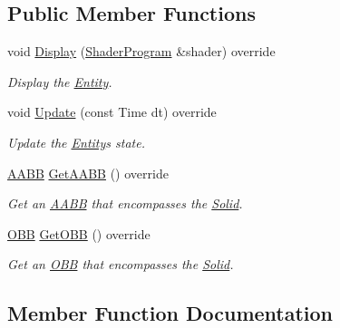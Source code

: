 \subsection*{Public Member Functions}
\begin{DoxyCompactItemize}
\item 
void \hyperlink{class_f_l_i_g_h_t_1_1_plane_a9332671f6542f3c401c19a1ec9eb86d7}{Display} (\hyperlink{class_f_l_i_g_h_t_1_1_shader_program}{Shader\+Program} \&shader) override
\begin{DoxyCompactList}\small\item\em Display the \hyperlink{class_f_l_i_g_h_t_1_1_entity}{Entity}. \end{DoxyCompactList}\item 
void \hyperlink{class_f_l_i_g_h_t_1_1_plane_a53d47170a7314c523f91e8dc26a5a9ab}{Update} (const Time dt) override
\begin{DoxyCompactList}\small\item\em Update the \hyperlink{class_f_l_i_g_h_t_1_1_entity}{Entity}\textquotesingle{}s state. \end{DoxyCompactList}\item 
\hyperlink{class_f_l_i_g_h_t_1_1_a_a_b_b}{A\+A\+BB} \hyperlink{class_f_l_i_g_h_t_1_1_plane_ada18a4bb3fa0cdbb4ab7a412eba92fe2}{Get\+A\+A\+BB} () override
\begin{DoxyCompactList}\small\item\em Get an \hyperlink{class_f_l_i_g_h_t_1_1_a_a_b_b}{A\+A\+BB} that encompasses the \hyperlink{class_f_l_i_g_h_t_1_1_solid}{Solid}. \end{DoxyCompactList}\item 
\hyperlink{class_f_l_i_g_h_t_1_1_o_b_b}{O\+BB} \hyperlink{class_f_l_i_g_h_t_1_1_plane_aaef56e8e418918a941ae740bbc818518}{Get\+O\+BB} () override
\begin{DoxyCompactList}\small\item\em Get an \hyperlink{class_f_l_i_g_h_t_1_1_o_b_b}{O\+BB} that encompasses the \hyperlink{class_f_l_i_g_h_t_1_1_solid}{Solid}. \end{DoxyCompactList}\end{DoxyCompactItemize}


\subsection{Member Function Documentation}
\mbox{\label{class_f_l_i_g_h_t_1_1_plane_a9332671f6542f3c401c19a1ec9eb86d7}} 
